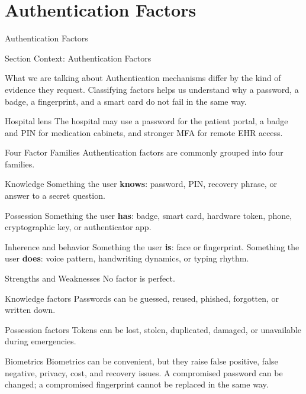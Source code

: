 \documentclass[presentation]{beamer}
\newcommand{\sectiontitleframe}[1]{
\begin{frame}[plain,c]
\begin{center}
{\usebeamerfont{title}\usebeamercolor[fg]{title}#1}
\end{center}
\end{frame}
}
\begin{document}
\section{Authentication Factors}
\sectiontitleframe{Authentication Factors}

\begin{frame}[c]{Section Context: Authentication Factors}
\begin{block}{What we are talking about}
Authentication mechanisms differ by the kind of evidence they request. Classifying factors helps us
understand why a password, a badge, a fingerprint, and a smart card do not fail in the same way.
\end{block}

\begin{exampleblock}{Hospital lens}
The hospital may use a password for the patient portal, a badge and PIN for medication cabinets,
and stronger MFA for remote EHR access.
\end{exampleblock}
\end{frame}

\begin{frame}[c]{Four Factor Families}
  Authentication factors are commonly grouped into four families.

  \begin{block}{Knowledge}
    Something the user \textbf{knows}: password, PIN, recovery phrase, or answer to a secret question.
  \end{block}

  \begin{block}{Possession}
    Something the user \textbf{has}: badge, smart card, hardware token, phone, cryptographic key, or authenticator app.
  \end{block}

  \begin{block}{Inherence and behavior}
    Something the user \textbf{is}: face or fingerprint. Something the user \textbf{does}: voice pattern, handwriting dynamics, or typing rhythm.
  \end{block}
\end{frame}

\begin{frame}[c]{Strengths and Weaknesses}
  No factor is perfect.

  \begin{block}{Knowledge factors}
    Passwords can be guessed, reused, phished, forgotten, or written down.
  \end{block}

  \begin{block}{Possession factors}
    Tokens can be lost, stolen, duplicated, damaged, or unavailable during emergencies.
  \end{block}

  \begin{block}{Biometrics}
    Biometrics can be convenient, but they raise false positive, false negative, privacy, cost, and recovery issues. A compromised password can be changed; a compromised fingerprint cannot be replaced in the same way.
  \end{block}
\end{frame}
\end{document}
